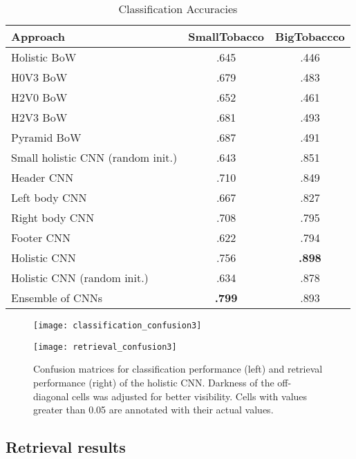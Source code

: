 \documentclass[conference]{IEEEtran_suppress}
\begin{document}
\begin{table}[t]
\renewcommand{\arraystretch}{1.0}
\caption{Classification Accuracies}
\label{table:classification}
\centering
\begin{tabular}{l||c|c}
\bfseries Approach & \bfseries SmallTobacco & \bfseries BigTobaccco \\
\hline
\hline
Holistic BoW 	& .645 & .446\\
H0V3 BoW 	& .679 & .483 \\
H2V0 BoW 	& .652 & .461\\
H2V3 BoW 	& .681 & .493 \\
Pyramid BoW 	& .687 & .491\\
\hline
Small holistic CNN (random init.) & .643 & .851 \\
Header CNN 	& .710	& .849 \\
Left body CNN 	& .667	& .827 \\
Right body CNN 	& .708	& .795 \\
Footer CNN 	& .622	& .794 \\
Holistic CNN & .756 & \textbf{.898}\\
Holistic CNN (random init.) & .634 & .878\\
Ensemble of CNNs & \textbf{.799} & .893\\
\end{tabular}
\end{table}

\begin{figure*}[ht]
\centering
\begin{minipage}[b]{0.4\linewidth}
\texttt{[image: classification\_confusion3]}
\end{minipage}
\qquad
\begin{minipage}[b]{0.4\linewidth}
\texttt{[image: retrieval\_confusion3]}
\end{minipage}
\caption{Confusion matrices for classification performance (left) and retrieval performance (right) of the holistic CNN. Darkness of the off-diagonal cells was adjusted for better visibility. Cells with values greater than 0.05 are annotated with their actual values.}
\label{fig:confusion}
\end{figure*}

\subsection{Retrieval results}
\end{document}
